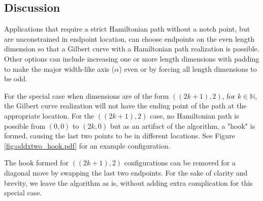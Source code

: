 \subsection{Discussion}

Applications that require a strict Hamiltonian path without a notch point, but are unconstrained in endpoint location, can choose
endpoints on the even length dimension so that a Gilbert curve with a Hamiltonian path realization is possible.
Other options can include increasing one or more length dimensions with padding to make the major width-like axis ($\alpha$) even or
by forcing all length dimensions to be odd.

For the special case when dimensions are of the form $((2k+1),2)$, for $k \in \mathbb{N}$, the Gilbert curve realization will
not have the ending point of the path at the appropriate location.
For the $((2k+1),2)$ case, no Hamiltonian path is possible from $(0,0)$ to $(2k,0)$ but as an artifact of the algorithm,
a "hook" is formed, causing the last two points to be in different locations.
See Figure \ref{fig:oddxtwo_hook.pdf} for an example configuration.

The hook formed for $((2k+1),2)$ configurations can be removed for a diagonal move by swapping the last two endpoints.
For the sake of clarity and brevity, we leave the algorithm as is, without adding extra complication for this special case.


